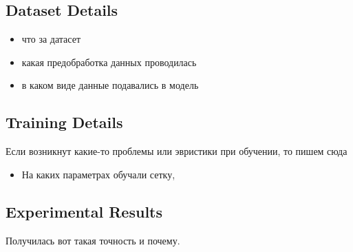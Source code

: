 \documentclass[a4paper,14pt]{article}
\theoremstyle{plain} %
\theoremstyle{definition} %
\theoremstyle{remark} %
\begin{document}
        \subsection{Dataset Details}
        \begin{itemize}
            \item что за датасет
            \item какая предобработка данных проводилась
            \item в каком виде данные подавались в модель
        \end{itemize}
        
        \subsection{Training Details}
        Если возникнут какие-то проблемы или эвристики при обучении, то пишем сюда
        \begin{itemize}
            \item На каких параметрах обучали сетку, 
        \end{itemize}

        \subsection{Experimental Results}
        Получилась вот такая точность и почему.
        
	\nocite{*}
        
	
\end{document}
